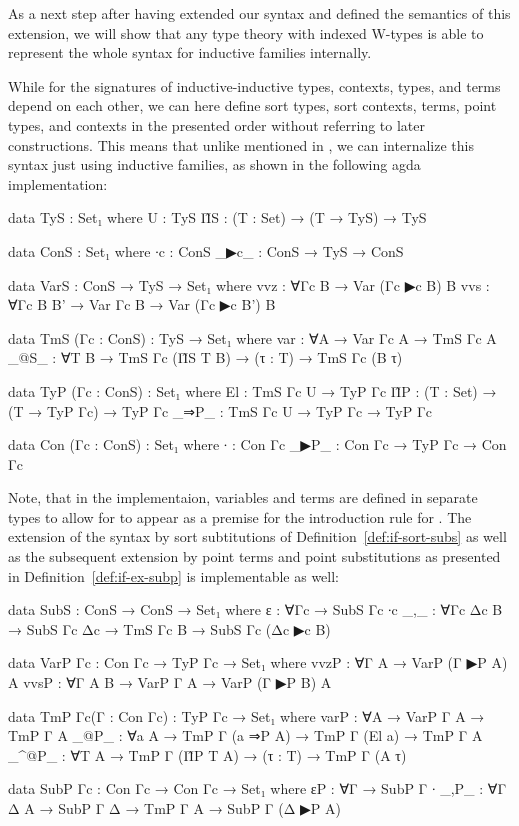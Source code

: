 
As a next step after having extended our syntax and defined the semantics of this
extension, we will show that any type theory with indexed W-types is able
to represent the whole syntax for inductive families internally.

\begin{remark}\label{rmk:if-impl}
While for the signatures of inductive-inductive types, contexts, types, and terms
depend on each other, we can here define sort types, sort contexts, terms, point
types, and contexts in the presented order without referring to later constructions.
This means that unlike mentioned in , we  can
internalize this syntax just using inductive families, as shown in the
following agda implementation:
\begin{agdacodebr}
data TyS : Set₁ where
  U  : TyS
  Π̂S : (T : Set) → (T → TyS) → TyS

data ConS : Set₁ where
  ∙c   : ConS
  _▶c_ : ConS → TyS → ConS

data VarS : ConS → TyS → Set₁ where
  vvz : ∀{Γc B} → Var (Γc ▶c B) B
  vvs : ∀{Γc B B'} → Var Γc B → Var (Γc ▶c B') B

data TmS (Γc : ConS) : TyS → Set₁ where
  var  : ∀{A} → Var Γc A → TmS Γc A
  _@S_ : ∀{T B} → TmS Γc (Π̂S T B) → (τ : T) → TmS Γc (B τ)

data TyP (Γc : ConS) : Set₁ where
  El   : TmS Γc U → TyP Γc
  Π̂P   : (T : Set) → (T → TyP Γc) → TyP Γc
  _⇒P_ : TmS Γc U → TyP Γc → TyP Γc

data Con (Γc : ConS) : Set₁ where
  ∙    : Con Γc
  _▶P_ : Con Γc → TyP Γc → Con Γc
\end{agdacodebr}
Note, that in the implementaion, variables and terms are defined in separate
types to allow for  to appear as a premise for the introduction rule
for .
The extension of the syntax by sort subtitutions of Definition~\ref{def:if-sort-subs}
as well as the subsequent extension by point terms and point substitutions as presented in
Definition~\ref{def:if-ex-subp} is implementable as well:
\begin{agdacodebr}
data SubS : ConS → ConS → Set₁ where
  ε   : ∀{Γc} → SubS Γc ∙c
  _,_ : ∀{Γc Δc B} → SubS Γc Δc → TmS Γc B → SubS Γc (Δc ▶c B)

data VarP {Γc} : Con Γc → TyP Γc → Set₁ where
  vvzP : ∀{Γ A} → VarP (Γ ▶P A) A
  vvsP : ∀{Γ A B} → VarP Γ A → VarP (Γ ▶P B) A

data TmP {Γc}(Γ : Con Γc) : TyP Γc → Set₁ where
  varP : ∀{A} → VarP Γ A → TmP Γ A
  _@P_ : ∀{a A} → TmP Γ (a ⇒P A) → TmP Γ (El a) → TmP Γ A
  _^@P_ : ∀{T A} → TmP Γ (Π̂P T A) → (τ : T) → TmP Γ (A τ)

data SubP {Γc} : Con Γc → Con Γc → Set₁ where
  εP   : ∀{Γ} → SubP Γ ∙
  _,P_ : ∀{Γ Δ A} → SubP Γ Δ → TmP Γ A → SubP Γ (Δ ▶P A)
\end{agdacodebr}
\end{remark}

